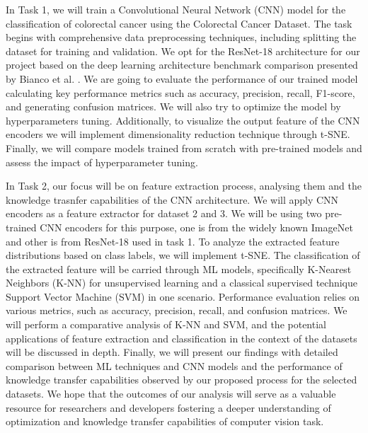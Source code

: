 \documentclass[10pt,twocolumn,letterpaper]{article}
\begin{document}
In Task 1, we will train a  Convolutional Neural Network (CNN) model for the classification of colorectal cancer using the Colorectal Cancer Dataset. The task begins with comprehensive data preprocessing techniques, including splitting the dataset for training and validation. We opt for the ResNet-18 architecture for our project based on the deep learning architecture benchmark comparison presented by Bianco et al. \cite{bianco2018benchmark}. We are going to evaluate the performance of our trained model calculating key performance metrics such as accuracy, precision, recall, F1-score, and generating confusion matrices. We will also try to optimize the model by hyperparameters tuning. Additionally, to visualize the output feature of the CNN encoders we will implement dimensionality reduction technique through t-SNE. Finally, we will compare models trained from scratch with pre-trained models and assess the impact of hyperparameter tuning. 

In Task 2, our focus will be on feature extraction process, analysing them and the knowledge trasnfer capabilities of the CNN architecture. We will apply CNN encoders as a feature extractor for dataset 2 and 3. We will be using two pre-trained CNN encoders for this purpose, one is from the widely known ImageNet \cite{krizhevsky2012imagenet} and other is from ResNet-18 used in task 1. To analyze the extracted feature distributions based on class labels, we will implement t-SNE. The classification of the extracted feature will be carried through ML models, specifically K-Nearest Neighbors (K-NN) for unsupervised learning and a classical supervised technique Support Vector Machine (SVM) in one scenario. Performance evaluation relies on various metrics, such as accuracy, precision, recall, and confusion matrices. We will perform a comparative analysis of K-NN and SVM, and the potential applications of feature extraction and classification in the context of the datasets will be discussed in depth. Finally, we will present our findings with detailed comparison between ML techniques and CNN models and the performance of knowledge transfer capabilities observed by our proposed process for the selected datasets. We hope that the outcomes of our analysis will serve as a valuable resource
for researchers and developers fostering a deeper understanding of optimization and knowledge transfer capabilities of computer vision task.
\end{document}
